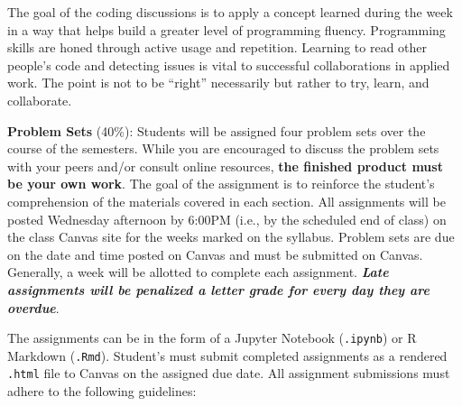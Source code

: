 \documentclass[
  12pt,
]{article}
\begin{document}
The goal of the coding discussions is to apply a concept learned during
the week in a way that helps build a greater level of programming
fluency. Programming skills are honed through active usage and
repetition. Learning to read other people's code and detecting issues is
vital to successful collaborations in applied work. The point is not to
be ``right'' necessarily but rather to try, learn, and collaborate.

\textbf{Problem Sets} (40\%): Students will be assigned four problem
sets over the course of the semesters. While you are encouraged to
discuss the problem sets with your peers and/or consult online
resources, \textbf{the finished product must be your own work}. The goal
of the assignment is to reinforce the student's comprehension of the
materials covered in each section. All assignments will be posted
Wednesday afternoon by 6:00PM (i.e., by the scheduled end of class) on
the class Canvas site for the weeks marked on the syllabus. Problem sets
are due on the date and time posted on Canvas and must be submitted on
Canvas. Generally, a week will be allotted to complete each assignment.
\textbf{\emph{Late assignments will be penalized a letter grade for
every day they are overdue}}.

The assignments can be in the form of a Jupyter Notebook
(\texttt{.ipynb}) or R Markdown (\texttt{.Rmd}). Student's must submit
completed assignments as a rendered \texttt{.html} file to Canvas on the
assigned due date. All assignment submissions must adhere to the
following guidelines:
\end{document}
